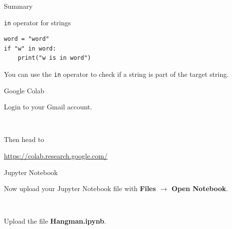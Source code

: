 \documentclass[dvipsnames, svgnames, x11names, handout]{beamer}
\begin{document}
\begin{frame}[fragile]{Summary}
\begin{block}{\texttt{in} operator for strings}
\begin{verbatim}
word = "word"
if "w" in word:
    print("w is in word")
\end{verbatim}
You can use the \texttt{in} operator to check if a string is part of the target string.
\end{block}
\end{frame}

\begin{frame}[fragile]{Google Colab}
    \begin{center}
        Login to your Gmail account.

        \

        Then head to

        \href{https://colab.research.google.com/}{https://colab.research.google.com/}
    \end{center}
\end{frame}

\begin{frame}[fragile]{Jupyter Notebook}
    \begin{center}
        Now upload your Jupyter Notebook file with \textbf{Files $\rightarrow$ Open Notebook}.
    
        \


        Upload the file \textbf{Hangman.ipynb}.
    
    \end{center}
\end{frame}
\end{document}
